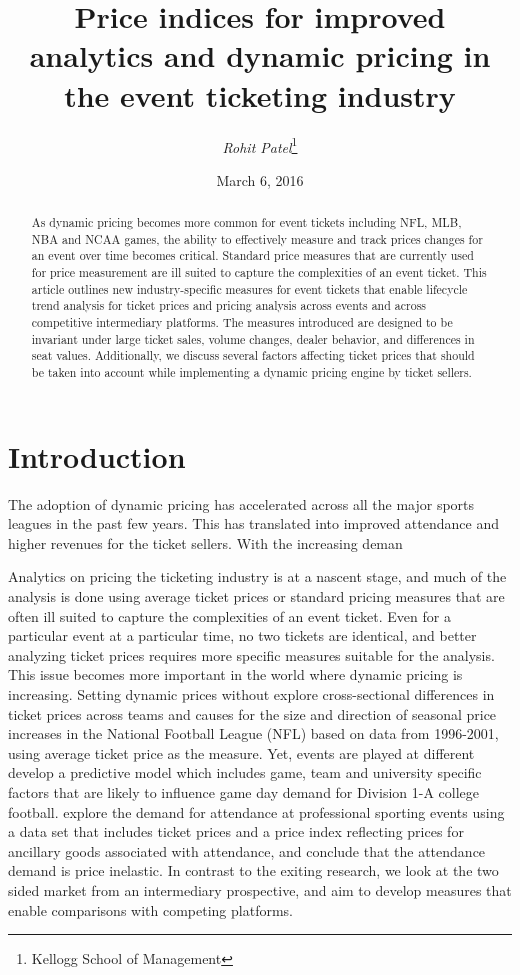 \documentclass[letterpaper, 12pt]{article}
\begin{document}
\title{Price indices for improved analytics and dynamic pricing in the event ticketing industry}
\author{\emph{Rohit Patel}\thanks{Kellogg School of Management}}
\date {March 6, 2016}
\maketitle
\begin{abstract} As dynamic pricing becomes more common for event tickets including NFL, MLB, NBA and NCAA games, the ability to effectively measure and track prices changes for an event over time becomes critical. Standard price measures that are currently used for price measurement are ill suited to capture the complexities of an event ticket. This article outlines new industry-specific measures for event tickets that enable lifecycle trend analysis for ticket prices and pricing analysis across events and across competitive intermediary platforms. The measures introduced are designed to be invariant under large ticket sales, volume changes, dealer behavior, and differences in seat values. Additionally, we discuss several factors affecting ticket prices that should be taken into account while implementing a dynamic pricing engine by ticket sellers.
\end{abstract}

\section{Introduction}
The adoption of dynamic pricing has accelerated across all the major sports leagues in the past few years. This has translated into improved attendance and higher revenues for the ticket sellers. With the increasing deman

Analytics on pricing the ticketing industry is at a nascent stage, and much of the analysis is done using average ticket prices or standard pricing measures that are often ill suited to capture the complexities of an event ticket. Even for a particular event at a particular time, no two tickets are identical, and better analyzing ticket prices requires more specific measures suitable for the analysis. This issue becomes more important in the world where dynamic pricing is increasing. Setting dynamic prices without \cite{rishe2003ticket} explore cross-sectional differences in ticket prices across teams and causes for the size and direction of seasonal price increases in the National Football League (NFL) based on data from 1996-2001, using average ticket price as the measure. Yet, events are played at different  \cite{price2003demand} develop a predictive model which includes game, team and university specific factors that are likely to influence game day demand for Division 1-A college football. \cite{coates2007ticket} explore the demand for attendance at professional sporting events using a data set that includes ticket prices and a price index reflecting prices for ancillary goods associated with attendance, and conclude that the attendance demand is price inelastic. In contrast to the exiting research, we look at the two sided market from an intermediary prospective, and aim to develop measures that enable comparisons with competing platforms. 
\end{document}
